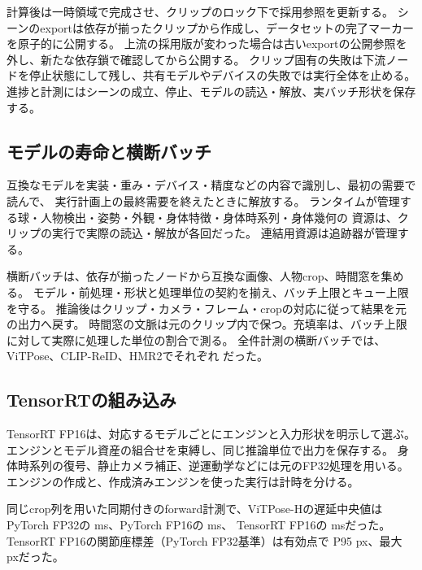 計算後は一時領域で完成させ、クリップのロック下で採用参照を更新する。
シーンのexportは依存が揃ったクリップから作成し、データセットの完了マーカーを原子的に公開する。
上流の採用版が変わった場合は古いexportの公開参照を外し、新たな依存鎖で確認してから公開する。
クリップ固有の失敗は下流ノードを停止状態にして残し、共有モデルやデバイスの失敗では実行全体を止める。
進捗と計測にはシーンの成立、停止、モデルの読込・解放、実バッチ形状を保存する。

\subsection{モデルの寿命と横断バッチ}

互換なモデルを実装・重み・デバイス・精度などの内容で識別し、最初の需要で読んで、
実行計画上の最終需要を終えたときに解放する。
ランタイムが管理する球・人物検出・姿勢・外観・身体特徴・身体時系列・身体幾何の
資源は、クリップの実行で実際の読込・解放が各回だった。
連結用資源は追跡器が管理する。

横断バッチは、依存が揃ったノードから互換な画像、人物crop、時間窓を集める。
モデル・前処理・形状と処理単位の契約を揃え、バッチ上限とキュー上限を守る。
推論後はクリップ・カメラ・フレーム・cropの対応に従って結果を元の出力へ戻す。
時間窓の文脈は元のクリップ内で保つ。充填率は、バッチ上限に対して実際に処理した単位の割合で測る。
全件計測の横断バッチでは、ViTPose、CLIP-ReID、HMR2でそれぞれ
だった。

\subsection{TensorRTの組み込み}

TensorRT FP16は、対応するモデルごとにエンジンと入力形状を明示して選ぶ。
エンジンとモデル資産の組合せを束縛し、同じ推論単位で出力を保存する。
身体時系列の復号、静止カメラ補正、逆運動学などには元のFP32処理を用いる。
エンジンの作成と、作成済みエンジンを使った実行は計時を分ける。

同じcrop列を用いた同期付きのforward計測で、ViTPose-Hの遅延中央値は
PyTorch FP32の ms、PyTorch FP16の ms、
TensorRT FP16の msだった。
TensorRT FP16の関節座標差（PyTorch FP32基準）は有効点で
P95  px、最大 pxだった。
\FloatBarrier
